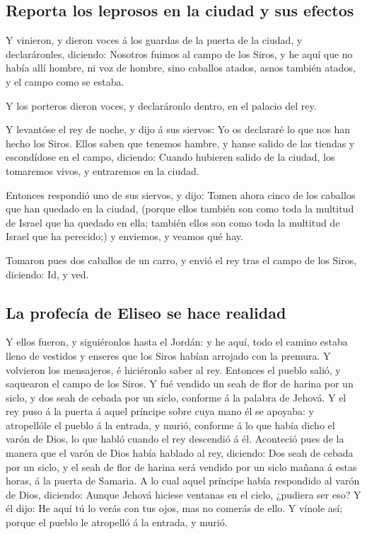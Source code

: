 \hypertarget{reporta-los-leprosos-en-la-ciudad-y-sus-efectos}{%
\subsection{Reporta los leprosos en la ciudad y sus
efectos}\label{reporta-los-leprosos-en-la-ciudad-y-sus-efectos}}

 Y vinieron, y dieron voces á los guardas de la puerta de
la ciudad, y declaráronles, diciendo: Nosotros fuimos al campo de los
Siros, y he aquí que no había allí hombre, ni voz de hombre, sino
caballos atados, asnos también atados, y el campo como se estaba.

 Y los porteros dieron voces, y declaráronlo dentro, en el
palacio del rey.

 Y levantóse el rey de noche, y dijo á sus siervos: Yo os
declararé lo que nos han hecho los Siros. Ellos saben que tenemos
hambre, y hanse salido de las tiendas y escondídose en el campo,
diciendo: Cuando hubieren salido de la ciudad, los tomaremos vivos, y
entraremos en la ciudad.

 Entonces respondió uno de sus siervos, y dijo: Tomen ahora
cinco de los caballos que han quedado en la ciudad, (porque ellos
también son como toda la multitud de Israel que ha quedado en ella;
también ellos son como toda la multitud de Israel que ha perecido;) y
enviemos, y veamos qué hay.

 Tomaron pues dos caballos de un carro, y envió el rey tras
el campo de los Siros, diciendo: Id, y ved.

\hypertarget{la-profecuxeda-de-eliseo-se-hace-realidad}{%
\subsection{La profecía de Eliseo se hace
realidad}\label{la-profecuxeda-de-eliseo-se-hace-realidad}}

 Y ellos fueron, y siguiéronlos hasta el Jordán: y he aquí,
todo el camino estaba lleno de vestidos y enseres que los Siros habían
arrojado con la premura. Y volvieron los mensajeros, é hiciéronlo saber
al rey.  Entonces el pueblo salió, y saquearon el campo de
los Siros. Y fué vendido un seah de flor de harina por un siclo, y dos
seah de cebada por un siclo, conforme á la palabra de Jehová.
 Y el rey puso á la puerta á aquel príncipe sobre cuya mano
él se apoyaba: y atropellóle el pueblo á la entrada, y murió, conforme á
lo que había dicho el varón de Dios, lo que habló cuando el rey
descendió á él.  Aconteció pues de la manera que el varón
de Dios había hablado al rey, diciendo: Dos seah de cebada por un siclo,
y el seah de flor de harina será vendido por un siclo mañana á estas
horas, á la puerta de Samaria.  A lo cual aquel príncipe
había respondido al varón de Dios, diciendo: Aunque Jehová hiciese
ventanas en el cielo, ¿pudiera ser eso? Y él dijo: He aquí tú lo verás
con tus ojos, mas no comerás de ello.  Y vínole así; porque
el pueblo le atropelló á la entrada, y murió.

